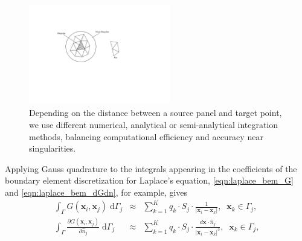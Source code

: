 \documentclass[final,leqno,]{siamltex1213}
\newcommand{\di}[1]{\text{d}#1}
\newcommand{\partiald}[2]{\frac{\partial #1}{\partial #2}}
\newcommand{\nhat}{\hat{n}}
\newcommand{\vect}[1]{\mathbf{#1}}
\begin{document}
\begin{figure}[t]
	\begin{centering}
\includegraphics[natwidth=5.15in,natheight=2.6in,width=0.55\textwidth]{IntegrationDomain.pdf}
	\caption{Depending on the distance between a source panel and target point, we use different numerical, analytical or semi-analytical integration methods, balancing computational efficiency and accuracy near singularities.}
	\label{fig:integration_domain}
	\end{centering}
\end{figure}


Applying Gauss quadrature to the integrals appearing in the coefficients of the boundary element discretization for Laplace's equation, \eqref{eqn:laplace_bem_G} and \eqref{eqn:laplace_bem_dGdn}, for example, gives
%
\begin{eqnarray}
	\label{eqn:gauss:1st-kind}
	\int_{\Gamma} G(\vect{x}_i,\vect{x}_j)\;\di{\Gamma_j} & \approx & \sum_{k=1}^{K} q_k\cdot S_j\cdot \frac{1}{|\vect{x}_i-\vect{x}_k|},\;\;\vect{x}_k \in \Gamma_j, \\ 
	\label{eqn:gauss:2nd-kind}
	\int_{\Gamma} \partiald{G(\vect{x}_i,\vect{x}_j)}{\nhat_j}\;\di{\Gamma_j} & \approx & \sum_{k=1}^{K}q_k\cdot S_j\cdot \frac{d\vect{x}\cdot\nhat_j}{|\vect{x}_i-\vect{x}_k|^{3}},\;\;\vect{x}_k \in \Gamma_j,
\end{eqnarray}
\end{document}

